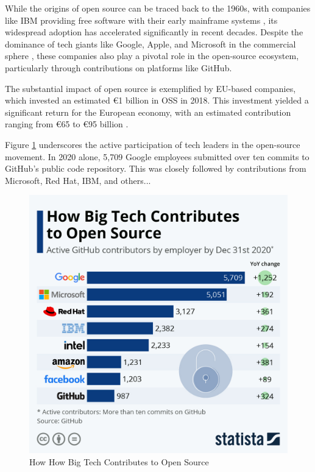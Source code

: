 While the origins of open source can be traced back to the 1960s, with companies like IBM providing free software with their early mainframe systems \cite{moreno2006open}, its widespread adoption has accelerated significantly in recent decades.  Despite the dominance of tech giants like Google, Apple, and Microsoft in the commercial sphere \cite{jacobides2020regulating}, these companies also play a pivotal role in the open-source ecosystem, particularly through contributions on platforms like GitHub.

The substantial impact of open source is exemplified by EU-based companies, which invested an estimated €1 billion in OSS in 2018. This investment yielded a significant return for the European economy, with an estimated contribution ranging from €65 to €95 billion \cite{blind2021impact}.

Figure \ref{fig:bigtechcontributes} underscores the active participation of tech leaders in the open-source movement.  In 2020 alone, 5,709 Google employees submitted over ten commits to GitHub's public code repository.  This was closely followed by contributions from Microsoft, Red Hat, IBM, and others...


\begin{figure}[ht]
\includegraphics[width=12cm]{figs/bigtechcontributes.jpeg}
\centering
\caption{How How Big Tech Contributes to Open Source \cite{statista2021bigtechopensource}}
\label{fig:bigtechcontributes}
\end{figure}



\clearpage  %
